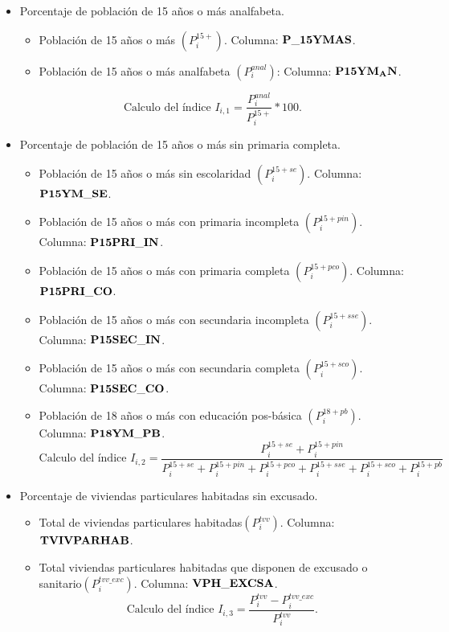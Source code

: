 \documentclass[paper=letter, fontsize=11pt]{scrartcl}
\numberwithin{equation}{section} %
\numberwithin{figure}{section} %
\numberwithin{table}{section} %
\begin{document}
\begin{itemize}
    \item Porcentaje de población de 15 años o más analfabeta. 
    \begin{itemize}
        \item  Población de 15 años o más $\left(P_i^{15+}\right)$. Columna: $\bf P\_15YMAS$.
        \item Población de 15 años o más analfabeta $\left(P_i^{anal}\right)$: Columna: $\bf P15YM_AN$.
    \end{itemize}
    $$\text{Calculo del índice }I_{i,1}=\frac{P_i^{anal}}{P_i^{15+}}*100.$$
    
    \item Porcentaje de población de 15 años o más sin primaria completa.
    \begin{itemize}
        \item Población de 15 años o más sin escolaridad $\left(P_i^{15+se}\right)$. Columna: $\bf P15YM\_SE$. 
        \item Población de 15 años o más con primaria incompleta $\left(P_i^{15+pin}\right)$. Columna: $\bf P15PRI\_IN$.
        \item Población de 15 años o más con primaria completa $\left(P_i^{15+pco}\right)$. Columna: $\bf P15PRI\_CO$.
        \item Población de 15 años o más con secundaria incompleta $\left(P_i^{15+sse}\right)$. Columna: $\bf P15SEC\_IN$.
        \item Población de 15 años o más con secundaria completa $\left(P_i^{15+sco}\right)$. Columna: $\bf P15SEC\_CO$.
        \item Población de 18 años o más con educación pos-básica $\left(P_i^{18+pb}\right)$. Columna: $\bf P18YM\_PB$.
    $$\text{Calculo del índice } I_{i,2}=\frac{P_i^{15+se}+P_i^{15+pin}}{P_i^{15+se}+P_i^{15+pin}+P_i^{15+pco}+P_i^{15+sse}+P_i^{15+sco}+P_i^{15+pb}}$$
    \end{itemize}
    \item Porcentaje de viviendas particulares habitadas sin excusado.
    \begin{itemize}
        \item Total de viviendas particulares habitadas$\left(P_i^{tvv}\right)$. Columna: $\bf TVIVPARHAB$.
        \item Total viviendas particulares habitadas que disponen de excusado o sanitario$\left(P_i^{tvv\_exc}\right)$. Columna: $\bf VPH\_EXCSA$.
        $$\text{Calculo del índice } I_{i,3}=\frac{P_i^{tvv}-P_i^{tvv\_exc}}{P_i^{tvv}}.$$

\end{itemize}
\end{itemize}
\end{document}
